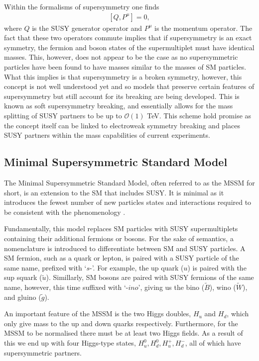 Within the formalisms of supersymmetry one finds 
\begin{align}
\left[Q, P^{\mu} \right] = 0,
\end{align}
where $Q$ is the SUSY generator operator and $P^{\mu}$ is the momentum operator.
The fact that these two operators commute implies that if supersymmetry is an exact symmetry, the fermion and boson states of the supermultiplet must have identical masses.
This, however, does not appear to be the case as no supersymmetric particles have been found to have masses similar to the masses of SM particles.
What this implies is that supersymmetry is a broken symmetry, however, this concept is not well understood yet and so models that preserve certain features of supersymmetry but still account for its breaking are being developed. 
This is known as soft supersymmetry breaking, and essentially allows for the mass splitting of SUSY partners to be up to $\mathcal{O}(1)$ TeV.
This scheme hold promise as the concept itself can be linked to electroweak symmetry breaking \cite{chung2005soft} and places SUSY partners within the mass capabilities of current experiments.

\subsection{Minimal Supersymmetric Standard Model} 
The Minimal Supersymmetric Standard Model, often referred to as the MSSM for short, is an extension to the SM that includes SUSY. 
It is minimal as it introduces the fewest number of new particles states and interactions required to be consistent with the phenomenology \cite{baer2006weak}.

Fundamentally, this model replaces SM particles with SUSY supermultiplets containing their additional fermions or bosons. 
For the sake of semantics, a nomenclature is introduced to differentiate between SM and SUSY particles.
A SM fermion, such as a quark or lepton, is paired with a SUSY particle of the same name, prefixed with `$s$-'. 
For example, the up quark ($u$) is paired with the sup squark ($\tilde{u}$).
Simillarly, SM bosons are paired with SUSY fermions of the same name, however, this time suffixed with `-$ino$', giving us the bino ($\tilde{B}$), wino ($\tilde{W}$), and gluino ($\tilde{g}$).

An important feature of the MSSM is the two Higgs doubles, $H_{u}$ and $H_{d}$, which only give mass to the up and down quarks respectively. 
Furthermore, for the MSSM to be normalised there must be at least two Higgs fields.
As a result of this we end up with four Higgs-type states, $H^{0}_{u},  H^{0}_{d}, H^{+}_{u}, H^{-}_{d}$, all of which have supersymmetric partners.

